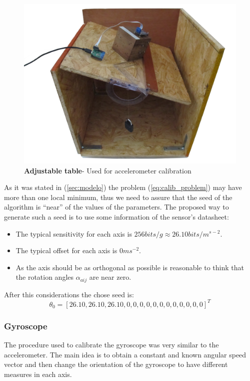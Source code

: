 \documentclass[conference]{IEEEtran}
\newcommand{\refp}[1]{(\ref{#1})}
\begin{document}
\begin{figure}
	\centering
	\includegraphics[width=.6\columnwidth]{./pics_paper/mesa.jpg}
	\caption{\textbf{Adjustable table}- Used for accelerometer calibration}
	\label{fig:mesa}
\end{figure}

As it was stated in \refp{sec:modelo} the problem \refp{eq:calib_problem} may have more than one local minimum, thus we need to assure that the seed of the algorithm is ``near'' of the values of the parameters. The proposed way to generate such a seed is to use some information of the sensor's datasheet\cite{bib:acc_data}: 

\begin{itemize}
\item The typical sensitivity for each axis is $256 bits/g \approx 26.10 bits / m^{s-2}$.
\item The typical offset for each axis is $0 ms^{-2}$.
\item As the axis should be as orthogonal as possible is reasonable to think that the rotation angles $\alpha_{aij}$ are near zero. 
\end{itemize}

After this considerations the chose seed is:
\begin{equation}
{\theta}_0 = [26.10, 26.10, 26.10, 0, 0, 0, 0, 0, 0, 0, 0, 0, 0, 0, 0]^T
\end{equation}
\subsubsection{Gyroscope}

The procedure used to calibrate the gyroscope was very similar to the accelerometer. The main idea is to obtain a constant and known angular speed vector and then change the orientation of the gyroscope to have different measures in each axis.\\
\end{document}
